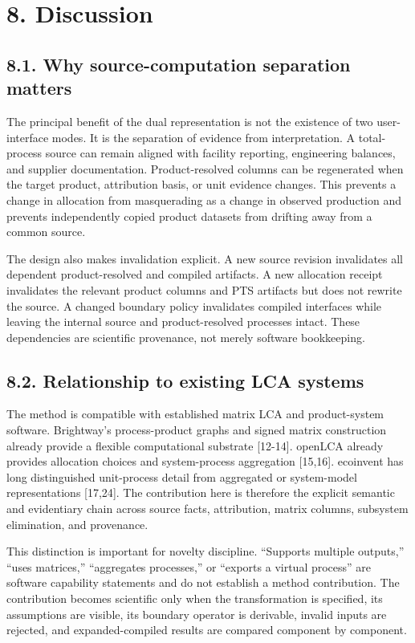 \documentclass[
  10pt,
  a4paper,
  DIV=11,
  numbers=noendperiod]{scrartcl}
\begin{document}
\section{8. Discussion}\label{discussion}

\subsection{8.1. Why source-computation separation
matters}\label{why-source-computation-separation-matters}

The principal benefit of the dual representation is not the existence of
two user-interface modes. It is the separation of evidence from
interpretation. A total-process source can remain aligned with facility
reporting, engineering balances, and supplier documentation.
Product-resolved columns can be regenerated when the target product,
attribution basis, or unit evidence changes. This prevents a change in
allocation from masquerading as a change in observed production and
prevents independently copied product datasets from drifting away from a
common source.

The design also makes invalidation explicit. A new source revision
invalidates all dependent product-resolved and compiled artifacts. A new
allocation receipt invalidates the relevant product columns and PTS
artifacts but does not rewrite the source. A changed boundary policy
invalidates compiled interfaces while leaving the internal source and
product-resolved processes intact. These dependencies are scientific
provenance, not merely software bookkeeping.

\subsection{8.2. Relationship to existing LCA
systems}\label{relationship-to-existing-lca-systems}

The method is compatible with established matrix LCA and product-system
software. Brightway's process-product graphs and signed matrix
construction already provide a flexible computational substrate
{[}12-14{]}. openLCA already provides allocation choices and
system-process aggregation {[}15,16{]}. ecoinvent has long distinguished
unit-process detail from aggregated or system-model representations
{[}17,24{]}. The contribution here is therefore the explicit semantic
and evidentiary chain across source facts, attribution, matrix columns,
subsystem elimination, and provenance.

This distinction is important for novelty discipline. ``Supports
multiple outputs,'' ``uses matrices,'' ``aggregates processes,'' or
``exports a virtual process'' are software capability statements and do
not establish a method contribution. The contribution becomes scientific
only when the transformation is specified, its assumptions are visible,
its boundary operator is derivable, invalid inputs are rejected, and
expanded-compiled results are compared component by component.
\end{document}
